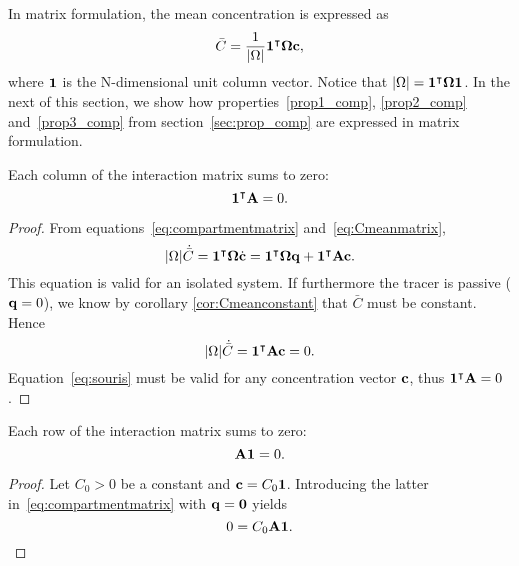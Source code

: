 In matrix formulation, the mean concentration is expressed as
\begin{equation} \label{eq:Cmeanmatrix}
	\bar C = \frac{1}{|\Omega|} \mathbf 1^\intercal \boldsymbol \Omega \mathbf c,
\end{equation}
where $\mathbf 1$ is the N-dimensional unit column vector. Notice that $|\Omega| = \mathbf 1^\intercal \boldsymbol \Omega \mathbf 1$. In the next of this section, we show how properties~\ref{prop1_comp}, \ref{prop2_comp} and~\ref{prop3_comp} from section~\ref{sec:prop_comp} are expressed in matrix formulation.
\begin{property} \label{prop1bis_comp}
Each column of the interaction matrix sums to zero:
\begin{equation}
	\mathbf 1^\intercal \mathbf A = 0.
\end{equation}
\end{property} 
\begin{proof}
	From equations~\eqref{eq:compartmentmatrix} and~\eqref{eq:Cmeanmatrix},
	\begin{equation}
		|\Omega| \dot{\bar{C}} = \mathbf 1^\intercal \boldsymbol \Omega \dot{\mathbf{c}} = \mathbf 1^\intercal \boldsymbol \Omega \mathbf q + \mathbf 1^\intercal\mathbf A \mathbf c.
	\end{equation}
	This equation is valid for an isolated system. If furthermore the tracer is passive ($\mathbf q=0$), we know by corollary \ref{cor:Cmeanconstant} that $\bar C$ must be constant. Hence
	\begin{equation} \label{eq:souris}
		|\Omega| \dot{\bar{C}} = \mathbf 1^\intercal\mathbf A \mathbf c = 0.
	\end{equation}
	Equation~\eqref{eq:souris} must be valid for any concentration vector $\mathbf c$, thus $\mathbf 1^\intercal \mathbf A = 0$.
\end{proof}

\begin{property} \label{prop2bis_comp}
	Each row of the interaction matrix sums to zero:
	\begin{equation}
		\mathbf A \mathbf 1 = 0.		
	\end{equation}	
\end{property}
\begin{proof}
	Let $C_0>0$ be a constant and $\mathbf c = C_0 \mathbf 1$. Introducing the latter in~\eqref{eq:compartmentmatrix} with $\mathbf q = \mathbf 0$ yields
	\begin{equation}
		0 = C_0 \mathbf A \mathbf 1.
	\end{equation}
\end{proof}

